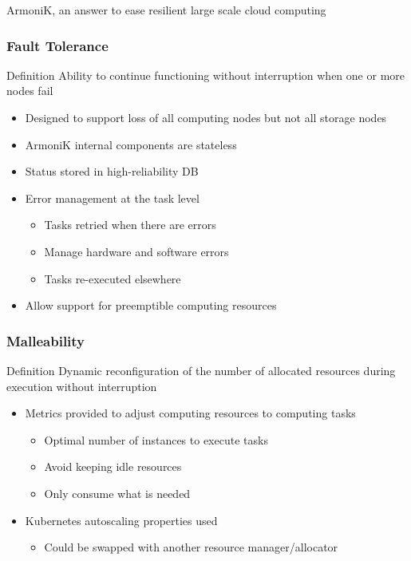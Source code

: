\documentclass[10pt,aspectratio=1609]{beamer}
\begin{document}
\begin{section}{ArmoniK, an answer to ease resilient large scale cloud computing}
  \begin{frame}
    \frametitle{Fault Tolerance}
    \begin{block}{Definition}
      Ability to continue functioning without interruption when one or more nodes fail
    \end{block}
    \begin{itemize}
      \item Designed to support loss of all computing nodes but not all storage nodes
      \item ArmoniK internal components are stateless
      \item Status stored in high-reliability DB
      \item Error management at the task level
      \begin{itemize}
        \item Tasks retried when there are errors
        \item Manage hardware and software errors
        \item Tasks re-executed elsewhere
      \end{itemize}
      \item Allow support for preemptible computing resources
    \end{itemize}
  \end{frame}

  \begin{frame}
    \frametitle{Malleability}
    \begin{block}{Definition}
      Dynamic reconfiguration of the number of allocated resources during execution without interruption
    \end{block}
    \begin{itemize}
      \item Metrics provided to adjust computing resources to computing tasks
      \begin{itemize}
        \item Optimal number of instances to execute tasks
        \item Avoid keeping idle resources
        \item Only consume what is needed
      \end{itemize}
      \item Kubernetes autoscaling properties used
      \begin{itemize}
        \item Could be swapped with another resource manager/allocator
      \end{itemize}
    \end{itemize}
  \end{frame}


\end{section}
\end{document}

